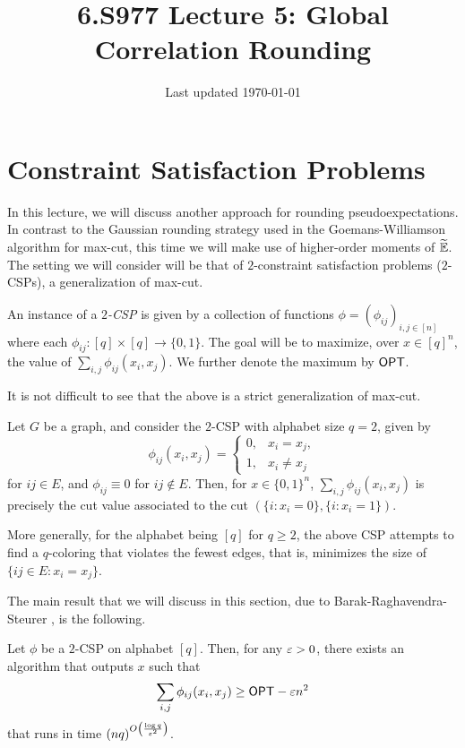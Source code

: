 \documentclass{article}
\title{6.S977 Lecture 5: Global Correlation Rounding}
\author{}
\date{Last updated \today}
\begin{document}
\maketitle
\thispagestyle{empty}

\section{Constraint Satisfaction Problems}

In this lecture, we will discuss another approach for rounding pseudoexpectations. In contrast to the Gaussian rounding strategy used in the Goemans-Williamson algorithm for max-cut, this time we will make use of higher-order moments of $\widetilde{\mathbb{E}}$.	The setting we will consider will be that of $2$-constraint satisfaction problems ($2$-CSPs), a generalization of max-cut.

\begin{fpr}
	An instance of a \emph{$2$-CSP} is given by a collection of functions $\phi = (\phi_{ij})_{i,j \in [n]}$ where each $\phi_{ij} : [q] \times [q] \to \{0,1\}$. The goal will be to maximize, over $x \in [q]^n$, the value of $\sum_{i,j}\phi_{ij}(x_i,x_j)$. We further denote the maximum by $\mathsf{OPT}$.
\end{fpr}

It is not difficult to see that the above is a strict generalization of max-cut.

\begin{fex}
	Let $G$ be a graph, and consider the $2$-CSP with alphabet size $q = 2$, given by
	\[ \phi_{ij}(x_i,x_j) = \begin{cases} 0, & x_i = x_j, \\ 1, & x_i \ne x_j \end{cases} \]
	for $ij \in E$, and $\phi_{ij} \equiv 0$ for $ij\not\in E$. Then, for $x \in \{0,1\}^n$, $\sum_{i,j} \phi_{ij}(x_i,x_j)$ is precisely the cut value associated to the cut $\left( \{i : x_i = 0\} , \{i : x_i = 1\} \right)$.

	More generally, for the alphabet being $[q]$ for $q\ge 2$, the above CSP attempts to find a $q$-coloring that violates the fewest edges, that is, minimizes the size of $\{ ij \in E : x_i = x_j \}$.
\end{fex}

The main result that we will discuss in this section, due to Barak-Raghavendra-Steurer \cite{BRS11}, is the following.

\begin{ftheo}
	\label{th:dense-csps}
	Let $\phi$ be a $2$-CSP on alphabet $[q]$. Then, for any $\varepsilon > 0$, there exists an algorithm that outputs $x$ such that
	\[ \sum_{i,j} \phi_{ij}(x_i,x_j) \ge \mathsf{OPT} - \varepsilon n^2 \]
	that runs in time $(nq)^{O\left( \frac{\log q}{\varepsilon^2} \right)}$.
\end{ftheo}
\end{document}
